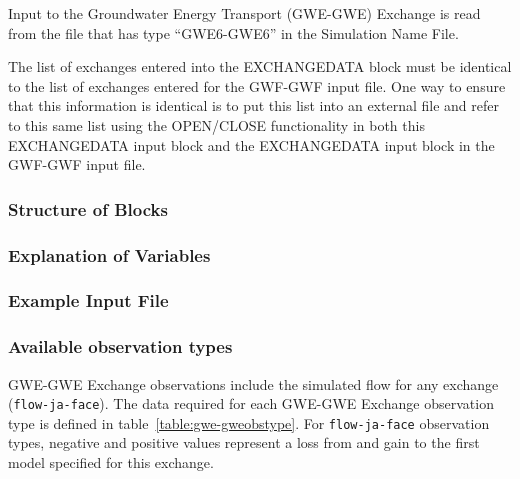Input to the Groundwater Energy Transport (GWE-GWE) Exchange is read from the file that has type ``GWE6-GWE6'' in the Simulation Name File.

The list of exchanges entered into the EXCHANGEDATA block must be identical to the list of exchanges entered for the GWF-GWF input file.  One way to ensure that this information is identical is to put this list into an external file and refer to this same list using the OPEN/CLOSE functionality in both this EXCHANGEDATA input block and the EXCHANGEDATA input block in the GWF-GWF input file.

\vspace{5mm}
\subsubsection{Structure of Blocks}




\vspace{5mm}
\subsubsection{Explanation of Variables}
\begin{description}

\end{description}

\vspace{5mm}
\subsubsection{Example Input File}


\vspace{5mm}
\subsubsection{Available observation types}
GWE-GWE Exchange observations include the simulated flow for any exchange (\texttt{flow-ja-face}). The data required for each GWE-GWE Exchange observation type is defined in table~\ref{table:gwe-gweobstype}. For \texttt{flow-ja-face} observation types, negative and positive values represent a loss from and gain to the first model specified for this exchange.


